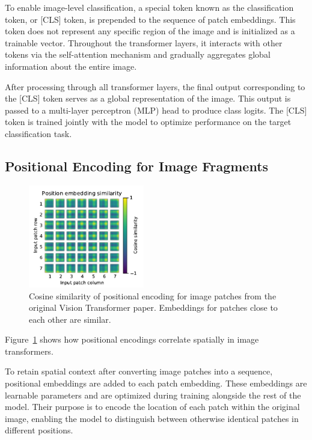 \documentclass{pracalicmgr}
\begin{document}
To enable image-level classification, a special token known as the classification token, or [CLS] token, is prepended to the sequence of patch embeddings. This token does not represent any specific region of the image and is initialized as a trainable vector. Throughout the transformer layers, it interacts with other tokens via the self-attention mechanism and gradually aggregates global information about the entire image.

After processing through all transformer layers, the final output corresponding to the [CLS] token serves as a global representation of the image. This output is passed to a multi-layer perceptron (MLP) head to produce class logits. The [CLS] token is trained jointly with the model to optimize performance on the target classification task.

\subsection{Positional Encoding for Image Fragments}

\begin{figure}[h]
    \centering
    \includegraphics[width=0.45\textwidth]{src/imNetEncodings.pdf}
    \caption{Cosine similarity of positional encoding for image patches from the original Vision Transformer paper. Embeddings for patches close to each other are similar.}
    \label{fig:imNetEncodings}
\end{figure}

Figure~\ref{fig:imNetEncodings} shows how positional encodings correlate spatially in image transformers.


To retain spatial context after converting image patches into a sequence, positional embeddings are added to each patch embedding. These embeddings are learnable parameters and are optimized during training alongside the rest of the model. Their purpose is to encode the location of each patch within the original image, enabling the model to distinguish between otherwise identical patches in different positions.
\end{document}
